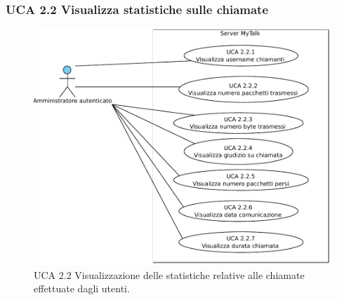 \newpage

\subsubsection{UCA 2.2 Visualizza statistiche sulle chiamate}

\begin{figure}[htbp]
\centering
\includegraphics[scale=0.7]{./casi_uso/UCA2-2.pdf}
\caption{UCA 2.2 Visualizzazione delle statistiche relative alle chiamate effettuate dagli utenti.}
\end{figure}

